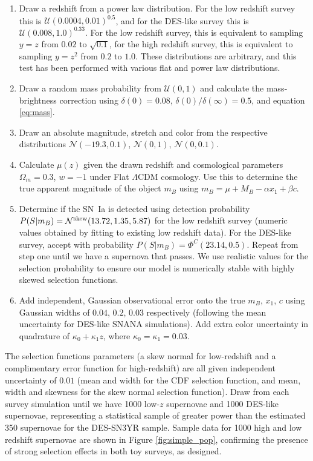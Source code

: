 \documentclass[a4paper,fleqn,usenatbib,manuscript]{emulateapj}
\newcommand{\blue}{\color{blue}}
\begin{document}
\begin{enumerate}[1.]
	\item Draw a redshift from a power law distribution. For the low redshift survey this is $\mathcal{U}(0.0004, 0.01)^{0.5}$, and for the DES-like survey this is $\mathcal{U}(0.008, 1.0)^{0.33}$. {\blue For the low redshift survey, this is equivalent to sampling $y = z$ from $0.02$ to $\sqrt{0.1}$, for the high redshift survey, this is equivalent to sampling $y = z^2$ from $0.2$ to $1.0$. These distributions are arbitrary, and this test has been performed with various flat and power law distributions.}
	\item Draw a random mass probability from $\mathcal{U}(0, 1)$ and calculate the mass-brightness correction using $\delta(0) = 0.08$, $\delta(0)/\delta(\infty) = 0.5$, and equation \eqref{eq:mass}.
	\item Draw an absolute magnitude, stretch and color from the respective distributions $\mathcal{N}(-19.3, 0.1)$, $\mathcal{N}(0, 1)$, $\mathcal{N}(0, 0.1)$.
	\item Calculate $\mu(z)$ given the drawn redshift and cosmological parameters $\Omega_m = 0.3$, $w = -1$ under Flat $\Lambda$CDM cosmology. Use this to determine the true apparent magnitude of the object $m_B$ using $m_B = \mu + M_B - \alpha x_1 + \beta c$.
	\item Determine if the SN~Ia is detected using detection probability $P(S|m_B) = \mathcal{N}^{\rm skew}(13.72, 1.35, 5.87)$ for the low redshift survey (numeric values obtained by fitting to existing low redshift data). For the DES-like survey, accept with probability $P(S|m_B) = \Phi^C(23.14, 0.5)$. Repeat from step one until we have a supernova that passes. We use realistic values for the selection probability to ensure our model is numerically stable with highly skewed selection functions.
	\item Add independent, Gaussian observational error onto the true $m_B$, $x_1$, $c$ using Gaussian widths of $0.04$, $0.2$, $0.03$ respectively (following the mean uncertainty for DES-like SNANA simulations). Add extra color uncertainty in quadrature of $\kappa_0 + \kappa_1 z$, where $\kappa_0 = \kappa_1 = 0.03$.
\end{enumerate}

The selection functions parameters (a skew normal for low-redshift and a complimentary error function for high-redshift) are all given independent uncertainty of $0.01$ (mean and width for the CDF selection function, and mean, width and skewness for the skew normal selection function). Draw from each survey simulation until we have 1000 low-$z$ supernovae and 1000 DES-like supernovae, representing a statistical sample of greater power than the estimated 350 supernovae for the DES-SN3YR sample. Sample data for 1000 high and low redshift supernovae are shown in Figure \ref{fig:simple_pop}, confirming the presence of strong selection effects in both toy surveys, as designed. 
\end{document}
